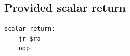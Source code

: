 \subsection{Provided scalar return}
\begin{verbatim}
scalar_return:
    jr $ra
    nop
\end{verbatim}
